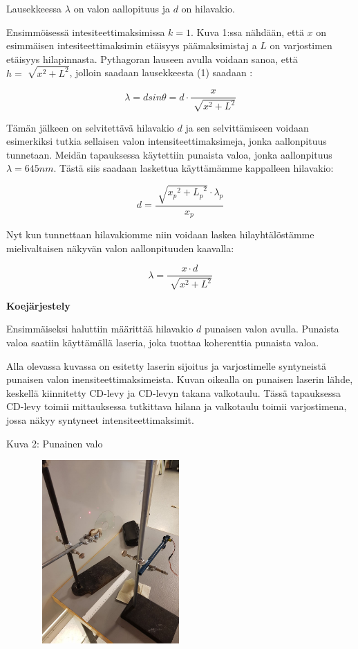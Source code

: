 \documentclass[11pt,a4paper]{article}
\begin{document}
Lausekkeessa $\lambda$ on valon aallopituus ja $d$ on hilavakio. 

Ensimmöisessä intesiteettimaksimissa $k=1$. Kuva 1:ssa nähdään, että $x$ on esimmäisen intesiteettimaksimin etäisyys päämaksimistaj a $L$ on varjostimen etäisyys hilapinnasta. Pythagoran lauseen avulla voidaan sanoa, että $h=\sqrt[]{x^2 + L^2}$, jolloin saadaan lausekkeesta (1) saadaan : 

$$
\lambda = d sin\theta = d\cdot \frac{x}{\sqrt[]{x^2 + L^2}}
$$

Tämän jälkeen on selvitettävä hilavakio $d$ ja sen selvittämiseen voidaan esimerkiksi tutkia sellaisen valon intensiteettimaksimeja, jonka aallonpituus tunnetaan. Meidän tapauksessa käytettiin punaista valoa, jonka aallonpituus $\lambda =645nm$. Tästä siis saadaan laskettua käyttämämme kappalleen hilavakio: 

$$ d=\frac{\sqrt[]{{x_p}^2 + {L_p}^2}\cdot {\lambda}_p}{x_p}$$

Nyt kun tunnettaan hilavakiomme niin voidaan laskea hilayhtälöstämme mielivaltaisen näkyvän valon aallonpituuden kaavalla: 

\begin{equation}
\lambda=\frac{x\cdot d}{\sqrt[]{x^2+L^2}}
\end{equation}


\vspace{0.5cm}

\noindent\Large\textbf{Koejärjestely}

\vspace{0.5cm}

\noindent Ensimmäiseksi haluttiin määrittää hilavakio $d$ punaisen valon avulla. Punaista valoa saatiin käyttämällä laseria, joka tuottaa koherenttia punaista valoa. 

Alla olevassa kuvassa on esitetty laserin sijoitus ja varjostimelle syntyneistä punaisen valon inensiteettimaksimeista. Kuvan oikealla on punaisen laserin lähde, keskellä kiinnitetty CD-levy ja CD-levyn takana valkotaulu. Tässä tapauksessa CD-levy toimii mittauksessa tutkittava hilana ja valkotaulu toimii varjostimena, jossa näkyy syntyneet intensiteettimaksimit. 

\noindent Kuva 2: Punainen valo

\vspace{0.3cm}

\hspace{1.5cm}\includegraphics[height=7cm, width=8cm]{3.jpg}
\end{document}

